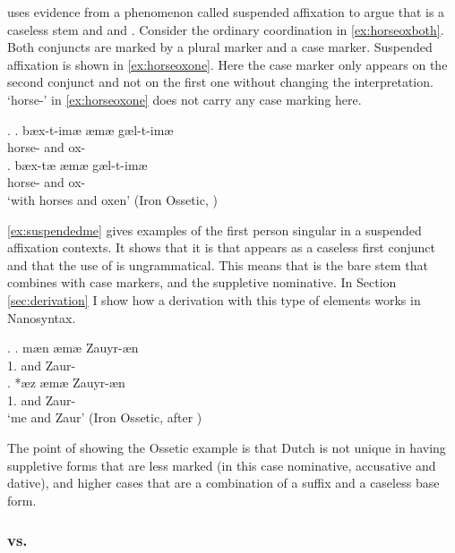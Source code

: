 \documentclass[12pt]{article}
\begin{document}
\citet{caha2019competition} uses evidence from a phenomenon called suspended affixation to argue that  is a caseless stem and and . Consider the ordinary coordination in \ref{ex:horseoxboth}. Both conjuncts are marked by a plural marker and a case marker. Suspended affixation is shown in \ref{ex:horseoxone}. Here the case marker only appears on the second conjunct and not on the first one without changing the interpretation.
 `horse-' in \ref{ex:horseoxone} does not carry any case marking here.

\ex.
\ag. bæx-t-imæ æmæ gæl-t-imæ\\
horse- and ox-\\\label{ex:horseoxboth}
\bg. bæx-tæ æmæ gæl-t-imæ\\
horse- and ox-\\
`with horses and oxen' \hfill (Iron Ossetic, \citealt[165]{erschler2012})\label{ex:horseoxone}

\ref{ex:suspendedme} gives examples of the first person singular in a suspended affixation contexts. It shows that it is  that appears as a caseless first conjunct and that the use of  is ungrammatical. This means that  is the bare stem that combines with case markers, and  the suppletive nominative. In Section \ref{sec:derivation} I show how a derivation with this type of elements works in Nanosyntax.

\ex.\label{ex:suspendedme}
\ag. mæn æmæ Zauyr-æn\\
 1. and Zaur-\\\label{ex:izaurboth}
\bg. *æz æmæ Zauyr-æn\\
 1. and Zaur-\\
 `me and Zaur' \hfill (Iron Ossetic, \citealt[39]{беляев2014} after \citealt{caha2019competition})\label{ex:izaurone}

The point of showing the Ossetic example is that Dutch is not unique in having suppletive forms that are less marked (in this case nominative, accusative and dative), and higher cases that are a combination of a suffix and a caseless base form.



\subsubsection{ vs. }
\end{document}
